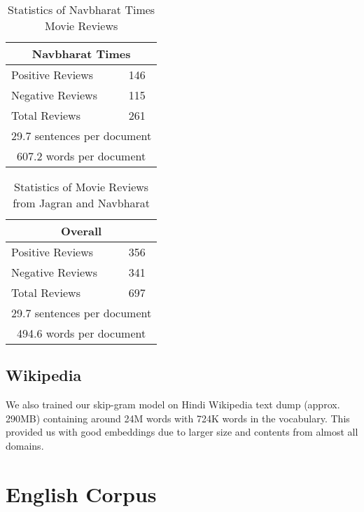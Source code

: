 \begin {table}[h!]
\large
\centering
\begin{tabular}{ |l|l| }
\hline
\multicolumn{2}{|c|}{\textbf{Navbharat Times}} \\
\hline
Positive Reviews & 146 \\ 
Negative Reviews & 115 \\
Total Reviews & 261\\ \hline
\multicolumn{2}{|c|}{29.7 sentences per document} \\ \hline
\multicolumn{2}{|c|}{607.2 words per document} \\
\hline
\end{tabular}
\caption {Statistics of Navbharat Times Movie Reviews}
\end{table}

\begin {table}[h!]
\large
\centering
\begin{tabular}{ |l|l| }
\hline
\multicolumn{2}{|c|}{\textbf{Overall}} \\
\hline
Positive Reviews & 356 \\ 
Negative Reviews & 341 \\
Total Reviews & 697\\ \hline
\multicolumn{2}{|c|}{29.7 sentences per document} \\ \hline
\multicolumn{2}{|c|}{494.6 words per document} \\
\hline
\end{tabular}
\caption {Statistics of Movie Reviews from Jagran and Navbharat}
\end{table}
\subsection{Wikipedia}
We also trained our skip-gram model on Hindi Wikipedia text dump (approx. 290MB) containing around 24M words with 724K words in the vocabulary. This provided us with good embeddings due to larger size and contents from almost all domains.

\section{English Corpus}
\label{english_corpus}
